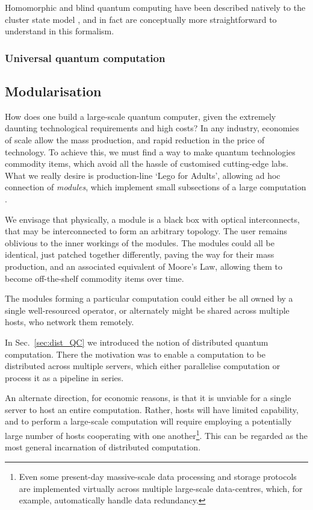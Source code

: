 \documentclass[aps,rmp,twocolumn,amsmath,amssymb,nofootinbib,superscriptaddress,longbibliography,floatfix]{revtex4-1}
\newcommand{\comment}[1]{{\color{blue}{\textbf{#1}}}}
\begin{document}
Homomorphic and blind quantum computing have been described natively to the cluster state model \cite{homoCS}, and in fact are conceptually more straightforward to understand in this formalism. 

%
%

\subsubsection{Universal quantum computation}

\comment{To do}

%
%

\subsection{Modularisation} \label{sec:module}

How does one build a large-scale quantum computer, given the extremely daunting technological requirements and high costs? In any industry, economies of scale allow the mass production, and rapid reduction in the price of technology. To achieve this, we must find a way to make quantum technologies commodity items, which avoid all the hassle of customised cutting-edge labs. What we really desire is production-line `Lego for Adults', allowing ad hoc connection of \emph{modules}, which implement small subsections of a large computation \cite{bib:FowlerPrivate}.

We envisage that physically, a module is a black box with optical interconnects, that may be interconnected to form an arbitrary topology. The user remains oblivious to the inner workings of the modules. The modules could all be identical, just patched together differently, paving the way for their mass production, and an associated equivalent of Moore's Law, allowing them to become off-the-shelf commodity items over time.

The modules forming a particular computation could either be all owned by a single well-resourced operator, or alternately might be shared across multiple hosts, who network them remotely.

In Sec.~\ref{sec:dist_QC} we introduced the notion of distributed quantum computation. There the motivation was to enable a computation to be distributed across multiple servers, which either parallelise computation or process it as a pipeline in series.

An alternate direction, for economic reasons, is that it is unviable for a single server to host an entire computation. Rather, hosts will have limited capability, and to perform a large-scale computation will require employing a potentially large number of hosts cooperating with one another\footnote{Even some present-day massive-scale data processing and storage protocols are implemented virtually across multiple large-scale data-centres, which, for example, automatically handle data redundancy.}. This can be regarded as the most general incarnation of distributed computation.
\end{document}

